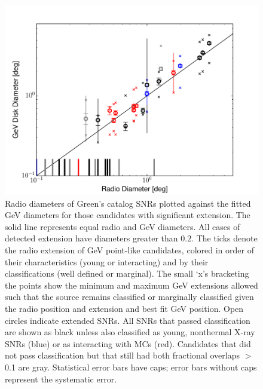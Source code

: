\begin{figure}[h!]
	\centering
	\includegraphics[width=1.\columnwidth]{figures/size_radio_vs_gev_xLims.pdf}
	\caption[Radio diameter of Green's catalog SNRs plotted against the fitted GeV diameterß]{Radio diameters of Green's catalog SNRs plotted against the fitted GeV diameters for those candidates with significant extension. The solid line represents equal radio and GeV diameters. All cases of detected extension have diameters greater than $0.2$\degr. The ticks denote the radio extension of GeV point-like candidates, colored in order of their characteristics (young or interacting) and by their classifications (well defined or marginal). The small `x's bracketing the points show the minimum and maximum GeV extensions allowed such that the source remains classified or marginally classified  given the radio position and extension and best fit GeV position. Open circles indicate extended SNRs. All SNRs that passed classification are shown as black unless also classified as young, nonthermal X-ray SNRs (blue) or as interacting with MCs (red). Candidates that did not pass classification but that still had both fractional overlaps $>$ 0.1 are gray.  Statistical error bars have caps; error bars without caps represent the systematic error. }
	\label{fig:GeVradioSize}
\end{figure}

